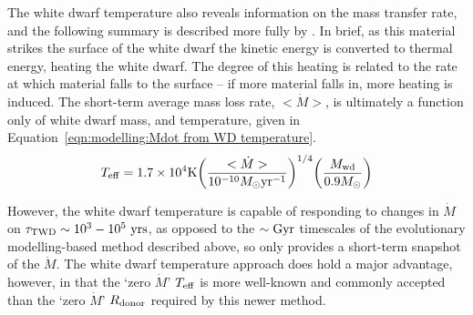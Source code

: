 The white dwarf temperature also reveals information on the mass transfer rate, and the following summary is described more fully by \citet{townsley2009}.
In brief, as this material strikes the surface of the white dwarf the kinetic energy is converted to thermal energy, heating the white dwarf. The degree of this heating is related to the rate at which material falls to the surface -- if more material falls in, more heating is induced.
The short-term average mass loss rate, $<\dot M>$, is ultimately a function only of white dwarf mass, and temperature, given in Equation~\ref{eqn:modelling:Mdot from WD temperature}.
\begin{equation}
    \label{eqn:modelling:Mdot from WD temperature}
    T_{\rm eff} = 1.7 \times 10^4 {\rm K} \bigg( \frac{<\dot M>}{10^{-10} M_\odot {\rm yr}^{-1}} \bigg)^{1/4} \bigg( \frac{M_{\rm wd}}{0.9 M_\odot} \bigg)
\end{equation}

However, the white dwarf temperature is capable of responding to changes in $\dot M$ on $\tau_{\rm TWD} \sim 10^3 - 10^5\ {\rm yrs}$, as opposed to the $\rm \sim Gyr$ timescales of the evolutionary modelling-based method described above, so only provides a short-term snapshot of the $\dot M$.
The white dwarf temperature approach does hold a major advantage, however, in that the `zero $\dot M$' $T_{\rm eff}$ is more well-known and commonly accepted than the `zero $\dot M$' $R_{\rm donor}$ required by this newer method.


